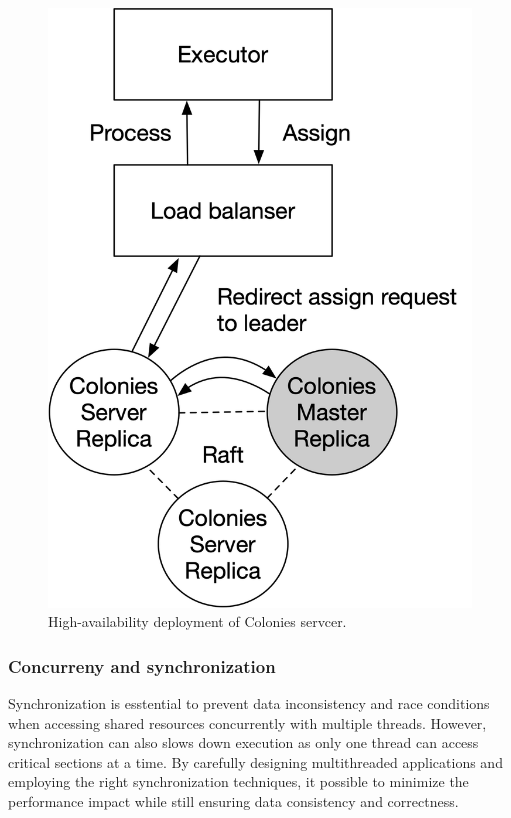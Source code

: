 \documentclass{article}
\begin{document}
\begin{figure}[h]
	\centering
    \includegraphics[scale=0.5]{raft.png}
	\caption{High-availability deployment of Colonies servcer.}
	\label{fig:ha_deployment}
\end{figure}

\subsubsection{Concurreny and synchronization}
Synchronization is esstential to prevent data inconsistency and race conditions when accessing shared resources concurrently with multiple threads. However, synchronization can also slows down execution as only one thread can access critical sections at a time. By carefully designing multithreaded applications and employing the right synchronization techniques, it possible to minimize the performance impact while still ensuring data consistency and correctness.  
\end{document}
